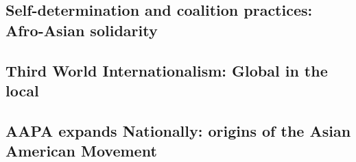\documentclass{article}
\begin{document}
\subsection{Self-determination and coalition practices: Afro-Asian solidarity}

\subsection{Third World Internationalism: Global in the local}

\subsection{AAPA expands Nationally: origins of the Asian American Movement}

  
\end{document}
